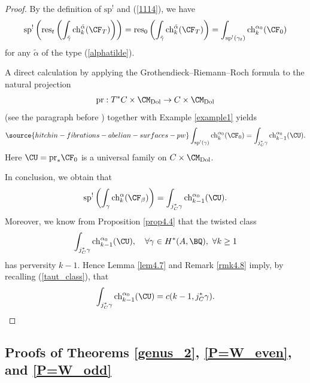 \begin{proof}
By the definition of $\mathrm{sp}^!$ and (\ref{1114}), we have
\[
\mathrm{sp}^!\left( \mathrm{res}_t\left( \int_{\tilde{\gamma}} \mathrm{ch}_k^{\tilde{\alpha}} (\CF_T) \right)\right) = \mathrm{res}_0\left( \int_{\tilde{\gamma}} \mathrm{ch}_k^{\tilde{\alpha}} (\CF_T) \right)= \int_{\mathrm{sp}^!(\gamma_t)} \mathrm{ch}_k^{\alpha_0}(\CF_0)
\]
for any $\tilde{\alpha}$ of the type (\ref{alphatilde}).


A direct calculation by applying the Grothendieck--Riemann--Roch formula to the natural projection
\[
\mathrm{pr}: T^*C\times \CM_{\mathrm{Dol}} \to C\times \CM_{\mathrm{Dol}}
\]
(see the paragraph before \cite[Remark 8]{Markman3}) together with Example \ref{example1} yields
\begin{equation*}\label{997}
\source{hitchin-fibrations-abelian-surfaces-pw}
\int_{\mathrm{sp}^!(\gamma)} \mathrm{ch}_k^{\alpha_0} (\CF_0) = \int_{j_C^*\gamma} \mathrm{ch}_{k-1}^{\alpha_0}(\CU).
\end{equation*}
Here $\CU = \mathrm{pr}_* \CF_0$ is a universal family on $C\times \CM_{\mathrm{Dol}}$.

In conclusion, we obtain that
\[
\mathrm{sp}^!\left( \int_{\gamma} \mathrm{ch}_k^\alpha (\CF_\beta) \right) = \int_{j_C^*\gamma} \mathrm{ch}_{k-1}^{\alpha_0}(\CU).
\]
Moreover, we know from Proposition \ref{prop4.4} that the twisted class \[
\int_{j_C^*\gamma} \mathrm{ch}_{k-1}^{\alpha_0}(\CU),\quad \forall \gamma \in H^*(A, \BQ),~ \forall k\geq 1
\]
has perversity $k-1$. Hence Lemma \ref{lem4.7} and Remark \ref{rmk4.8} imply, by recalling (\ref{taut_class}), that
\[
\int_{j_C^*\gamma} \mathrm{ch}_{k-1}^{\alpha_0}(\CU) = c(k-1, j_C^*\gamma). \qedhere
\]
\end{proof}

\subsection{Proofs of Theorems \ref{genus_2}, \ref{P=W_even}, and \ref{P=W_odd}}\label{Section4.6}

